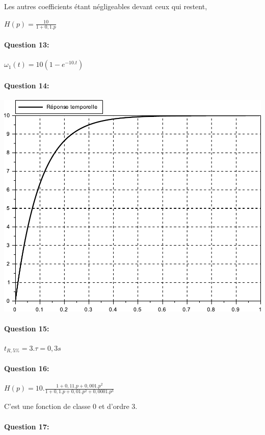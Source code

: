 Les autres coefficients étant négligeables devant ceux qui restent,

$H(p)=\frac{10}{1+0,1.p}$

\paragraph{Question 13:}

$\omega_1(t)=10(1-e^{-10.t})$

\newpage

\paragraph{Question 14:}

\begin{center}
 \includegraphics[width=0.8\linewidth]{img/q14_cor}
\end{center}

\paragraph{Question 15:}

$t_{R,5\%}=3.\tau=0,3s$

\paragraph{Question 16:}

$H(p)=10.\frac{1+0,11.p+0,001.p^2}{1+0,1.p+0,01.p^2+0,0001.p^3}$

C'est une fonction de classe 0 et d'ordre 3.

\paragraph{Question 17:}

